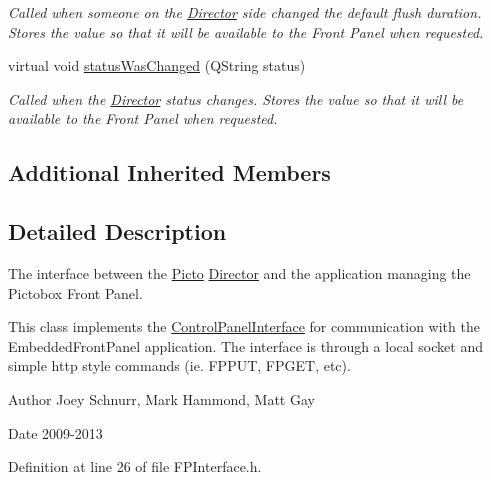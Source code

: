 \begin{DoxyCompactItemize}
\begin{DoxyCompactList}\small\item\em Called when someone on the \hyperlink{class_director}{Director} side changed the default flush duration. Stores the value so that it will be available to the Front Panel when requested. \end{DoxyCompactList}\item 
\hypertarget{class_f_p_interface_ae096571c8ac5e609915ddab1a8608be9}{virtual void \hyperlink{class_f_p_interface_ae096571c8ac5e609915ddab1a8608be9}{status\-Was\-Changed} (Q\-String status)}\label{class_f_p_interface_ae096571c8ac5e609915ddab1a8608be9}

\begin{DoxyCompactList}\small\item\em Called when the \hyperlink{class_director}{Director} status changes. Stores the value so that it will be available to the Front Panel when requested. \end{DoxyCompactList}\end{DoxyCompactItemize}
\subsection*{Additional Inherited Members}


\subsection{Detailed Description}
The interface between the \hyperlink{namespace_picto}{Picto} \hyperlink{class_director}{Director} and the application managing the Pictobox Front Panel. 

This class implements the \hyperlink{class_control_panel_interface}{Control\-Panel\-Interface} for communication with the Embedded\-Front\-Panel application. The interface is through a local socket and simple http style commands (ie. F\-P\-P\-U\-T, F\-P\-G\-E\-T, etc). \begin{DoxyAuthor}{Author}
Joey Schnurr, Mark Hammond, Matt Gay 
\end{DoxyAuthor}
\begin{DoxyDate}{Date}
2009-\/2013 
\end{DoxyDate}


Definition at line 26 of file F\-P\-Interface.\-h.



